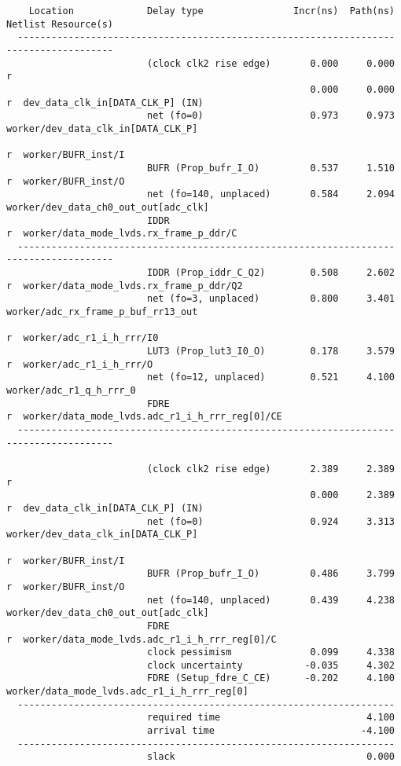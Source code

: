 \documentclass{article}
\begin{document}
\begin{lstlisting}
    Location             Delay type                Incr(ns)  Path(ns)    Netlist Resource(s)
  -------------------------------------------------------------------    -------------------
                         (clock clk2 rise edge)       0.000     0.000 r  
                                                      0.000     0.000 r  dev_data_clk_in[DATA_CLK_P] (IN)
                         net (fo=0)                   0.973     0.973    worker/dev_data_clk_in[DATA_CLK_P]
                                                                      r  worker/BUFR_inst/I
                         BUFR (Prop_bufr_I_O)         0.537     1.510 r  worker/BUFR_inst/O
                         net (fo=140, unplaced)       0.584     2.094    worker/dev_data_ch0_out_out[adc_clk]
                         IDDR                                         r  worker/data_mode_lvds.rx_frame_p_ddr/C
  -------------------------------------------------------------------    -------------------
                         IDDR (Prop_iddr_C_Q2)        0.508     2.602 r  worker/data_mode_lvds.rx_frame_p_ddr/Q2
                         net (fo=3, unplaced)         0.800     3.401    worker/adc_rx_frame_p_buf_rr13_out
                                                                      r  worker/adc_r1_i_h_rrr/I0
                         LUT3 (Prop_lut3_I0_O)        0.178     3.579 r  worker/adc_r1_i_h_rrr/O
                         net (fo=12, unplaced)        0.521     4.100    worker/adc_r1_q_h_rrr_0
                         FDRE                                         r  worker/data_mode_lvds.adc_r1_i_h_rrr_reg[0]/CE
  -------------------------------------------------------------------    -------------------

                         (clock clk2 rise edge)       2.389     2.389 r  
                                                      0.000     2.389 r  dev_data_clk_in[DATA_CLK_P] (IN)
                         net (fo=0)                   0.924     3.313    worker/dev_data_clk_in[DATA_CLK_P]
                                                                      r  worker/BUFR_inst/I
                         BUFR (Prop_bufr_I_O)         0.486     3.799 r  worker/BUFR_inst/O
                         net (fo=140, unplaced)       0.439     4.238    worker/dev_data_ch0_out_out[adc_clk]
                         FDRE                                         r  worker/data_mode_lvds.adc_r1_i_h_rrr_reg[0]/C
                         clock pessimism              0.099     4.338    
                         clock uncertainty           -0.035     4.302    
                         FDRE (Setup_fdre_C_CE)      -0.202     4.100    worker/data_mode_lvds.adc_r1_i_h_rrr_reg[0]
  -------------------------------------------------------------------
                         required time                          4.100    
                         arrival time                          -4.100    
  -------------------------------------------------------------------
                         slack                                  0.000    




\end{lstlisting}
\end{document}
